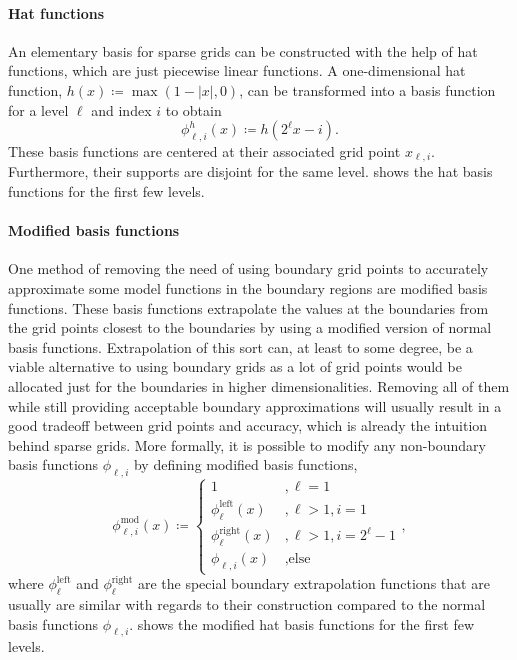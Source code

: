 \documentclass[
  a4paper,  %
  twoside,  %
  bibliography=totoc,
  headsepline,
  cleardoublepage=empty,
  parskip=half,
  draft=false
]{scrbook}
\begin{document}
\paragraph{Hat functions}
An elementary basis for sparse grids can be constructed with the help of hat functions, which are just piecewise linear functions.
A one-dimensional hat function, $h(x) \coloneqq \max(1 - |x|,0)$, can be transformed into a basis function for a level $\ell$ and index $i$ to obtain
\begin{equation}
\phi^h_{\ell,i}(x) \coloneqq h(2^\ell x-i).
\end{equation}
These basis functions are centered at their associated grid point $x_{\ell,i}$.
Furthermore, their supports are disjoint for the same level.
 shows the hat basis functions for the first few levels.

\paragraph{Modified basis functions}
One method of removing the need of using boundary grid points to accurately approximate some model functions in the boundary regions are modified basis functions.
These basis functions extrapolate the values at the boundaries from the grid points closest to the boundaries by using a modified version of normal basis functions.
Extrapolation of this sort can, at least to some degree, be a viable alternative to using boundary grids as a lot of grid points would be allocated just for the boundaries in higher dimensionalities.
Removing all of them while still providing acceptable boundary approximations will usually result in a good tradeoff between grid points and accuracy, which is already the intuition behind sparse grids.
More formally, it is possible to modify any non-boundary basis functions $\phi_{\ell,i}$ by defining modified basis functions,
\begin{equation}
\phi^{\mathrm{mod}}_{\ell,i}(x) \coloneqq
\begin{cases}
1 &, \ell=1\\
\phi^{\mathrm{left}}_{\ell}(x)&, \ell>1, i=1\\
\phi^{\mathrm{right}}_{\ell}(x)&, \ell>1, i=2^\ell - 1\\
\phi_{\ell,i}(x)&, \text{else}
\end{cases},
\end{equation}
where $\phi^{\text{left}}_{\ell}$ and $\phi^{\text{right}}_{\ell}$ are the special boundary extrapolation functions that are usually are similar with regards to their construction compared to the normal basis functions $\phi_{\ell,i}$.
 shows the modified hat basis functions for the first few levels.
\end{document}

